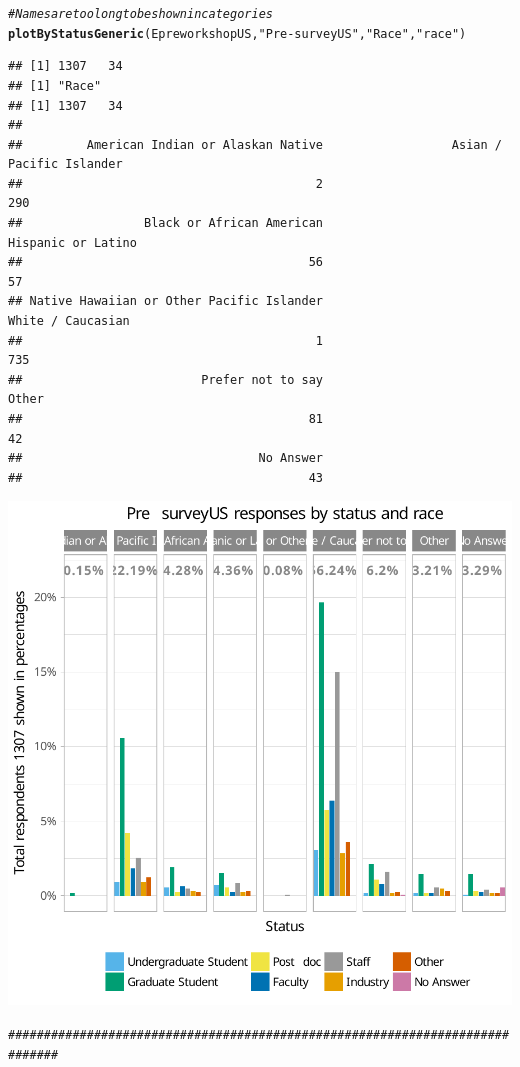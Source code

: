 \documentclass{article}\usepackage[]{graphicx}\usepackage[]{color}
\makeatletter
\newcommand{\hlstr}[1]{\textcolor[rgb]{0.192,0.494,0.8}{#1}}%
\newcommand{\hlcom}[1]{\textcolor[rgb]{0.678,0.584,0.686}{\textit{#1}}}%
\newcommand{\hlstd}[1]{\textcolor[rgb]{0.345,0.345,0.345}{#1}}%
\newcommand{\hlkwd}[1]{\textcolor[rgb]{0.737,0.353,0.396}{\textbf{#1}}}%
\newenvironment{kframe}{%
 \def\at@end@of@kframe{}%
 \ifinner\ifhmode%
  \def\at@end@of@kframe{\end{minipage}}%
  \begin{minipage}{\columnwidth}%
 \fi\fi%
 \def\FrameCommand##1{\hskip\@totalleftmargin \hskip-\fboxsep
 \colorbox{shadecolor}{##1}\hskip-\fboxsep
     \hskip-\linewidth \hskip-\@totalleftmargin \hskip\columnwidth}%
 \MakeFramed {\advance\hsize-\width
   \@totalleftmargin\z@ \linewidth\hsize
   \@setminipage}}%
 {\par\unskip\endMakeFramed%
 \at@end@of@kframe}
\newenvironment{knitrout}{}{} %
\makeatother
\begin{document}
\begin{knitrout}
{}


\begin{kframe}\begin{alltt}
\hlcom{# Names are too long to be shown in categories }
\hlkwd{plotByStatusGeneric}\hlstd{(EpreworkshopUS,} \hlstr{"Pre-surveyUS"}\hlstd{,} \hlstr{"Race"} \hlstd{,} \hlstr{"race"}\hlstd{)}
\end{alltt}
\begin{verbatim}
## [1] 1307   34
## [1] "Race"
## [1] 1307   34
## 
##         American Indian or Alaskan Native                  Asian / Pacific Islander 
##                                         2                                       290 
##                 Black or African American                        Hispanic or Latino 
##                                        56                                        57 
## Native Hawaiian or Other Pacific Islander                         White / Caucasian 
##                                         1                                       735 
##                         Prefer not to say                                     Other 
##                                        81                                        42 
##                                 No Answer 
##                                        43
\end{verbatim}
\end{kframe}

{\centering \includegraphics[width=.6\linewidth]{figure/calls-Rnwplotting-presurvey-dataUS-4} 

}


\begin{kframe}\begin{alltt}
\hlcom{# ############################################################################}
\end{alltt}
\end{kframe}
\end{knitrout}
\end{document}
